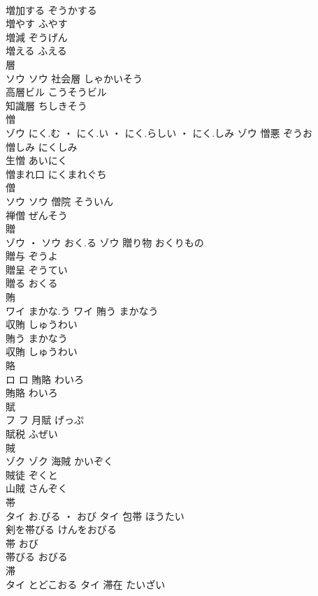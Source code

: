 \documentclass[8pt]{extreport}
\begin{document}
\begin{CJK}{UTF8}{min}
\\	増加する	ぞうかする	
\\	増やす	ふやす	
\\	増減	ぞうげん	
\\	増える	ふえる	
\\	層	
\\	ソウ		ソウ	社会層	しゃかいそう	
\\	高層ビル	こうそうビル	
\\	知識層	ちしきそう	
\\	憎	
\\	ゾウ	にく.む ・ にく.い ・ にく.らしい ・ にく.しみ	ゾウ	憎悪	ぞうお	
\\	憎しみ	にくしみ	
\\	生憎	あいにく	
\\	憎まれ口	にくまれぐち	
\\	僧	
\\	ソウ		ソウ	僧院	そういん	
\\	禅僧	ぜんそう	
\\	贈	
\\	ゾウ ・ ソウ	おく.る	ゾウ	贈り物	おくりもの	
\\	贈与	ぞうよ	
\\	贈呈	ぞうてい	
\\	贈る	おくる	
\\	賄	
\\	ワイ	まかな.う	ワイ	賄う	まかなう	
\\	収賄	しゅうわい	
\\	賄う	まかなう	
\\	収賄	しゅうわい	
\\	賂	
\\	ロ		ロ	賄賂	わいろ	
\\	賄賂	わいろ	
\\	賦	
\\	フ		フ	月賦	げっぷ	
\\	賦税	ふぜい	
\\	賊	
\\	ゾク		ゾク	海賊	かいぞく	
\\	賊徒	ぞくと	
\\	山賊	さんぞく	
\\	帯	
\\	タイ	お.びる ・ おび	タイ	包帯	ほうたい	
\\	剣を帯びる	けんをおびる	
\\	帯	おび	
\\	帯びる	おびる	
\\	滞	
\\	タイ	とどこおる	タイ	滞在	たいざい	

\end{CJK}
\end{document}
